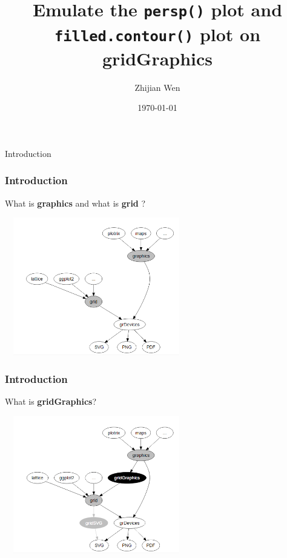 \documentclass{beamer}
\title[Master Presentation]{
Emulate the \texttt{persp()} plot and \texttt{filled.contour()} plot on \textbf{gridGraphics}
} %
\author{Zhijian Wen} %
\institute[UOA] %
{
University of Auckland \\ %
\medskip
\textit{jwen246@aucklanduni.ac.nz} %
}
\date{\today} %
\begin{document}


\begin{frame}
\titlepage %
\end{frame}




\begin{frame}[fragile]
\begin{center}
  \Huge Introduction
\end{center}
\end{frame}


\begin{frame}[fragile]

\frametitle{Introduction}
What is \textbf{graphics} and what is \textbf{grid} ?
\begin{center}
\includegraphics[width = 8cm, height = 6cm]{plot/grid_and_graphics.PNG}
\end{center}

\end{frame}



\begin{frame}[fragile]

\frametitle{Introduction}

What is \textbf{gridGraphics}?
\begin{center}
\includegraphics[width = 8cm, height = 6cm]{plot/grid_graphics.png}
\end{center}

\end{frame}
\end{document}
